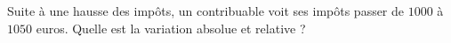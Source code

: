 
\begin{exercice}\label{exosmath-0099}

    Suite à une hausse des impôts, un contribuable voit ses impôts passer de \( 1000\) à \( 1050\) euros. Quelle est la variation absolue et relative ?

\end{exercice}
